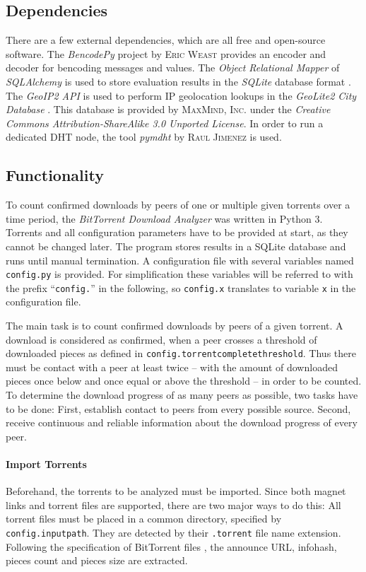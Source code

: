 \documentclass[10pt, a4paper]{scrartcl} %
\renewcommand{\_}{\origunderscore\allowbreak}
\newcommand{\config}[1]{\texttt{config.\allowbreak #1}}
\begin{document}
\subsection{Dependencies}
There are a few external dependencies, which are all free and open-source software. The \emph{BencodePy} project by \textsc{Eric Weast} \cite{bencodepy} provides an encoder and decoder for bencoding messages and values. The \emph{Object Relational Mapper} of \emph{SQLAlchemy} \cite{sqlalchemy} is used to store evaluation results in the \emph{SQLite} database format \cite{sqlite}. The \emph{GeoIP2 API} \cite{geoip2-api} is used to perform IP geolocation lookups in the \emph{GeoLite2 City Database} \cite{geolite2-db}. This database is provided by \textsc{MaxMind, Inc.} under the \emph{Creative Commons Attribution-ShareAlike 3.0 Unported License}. In order to run a dedicated DHT node, the tool \emph{pymdht} by \textsc{Raul Jimenez} \cite{pymdht} is used.

\subsection{Functionality}
To count confirmed downloads by peers of one or multiple given torrents over a time period, the \emph{BitTorrent Download Analyzer} was written in Python 3. Torrents and all configuration parameters have to be provided at start, as they cannot be changed later. The program stores results in a SQLite database and runs until manual termination. A configuration file with several variables named \texttt{config.py} is provided. For simplification these variables will be referred to with the prefix ``\texttt{config.}'' in the following, so \config{x} translates to variable \texttt{x} in the configuration file.

The main task is to count confirmed downloads by peers of a given torrent. A download is considered as confirmed, when a peer crosses a threshold of downloaded pieces as defined in \config{torrent\_complete\_threshold}. Thus there must be contact with a peer at least twice -- with the amount of downloaded pieces once below and once equal or above the threshold -- in order to be counted. To determine the download progress of as many peers as possible, two tasks have to be done: First, establish contact to peers from every possible source. Second, receive continuous and reliable information about the download progress of every peer.

\paragraph{Import Torrents}
Beforehand, the torrents to be analyzed must be imported. Since both magnet links and torrent files are supported, there are two major ways to do this: All torrent files must be placed in a common directory, specified by \config{input\_path}. They are detected by their \texttt{.torrent} file name extension. Following the specification of BitTorrent files \cite{bep3}, the announce URL, infohash, pieces count and pieces size are extracted.
\end{document}
